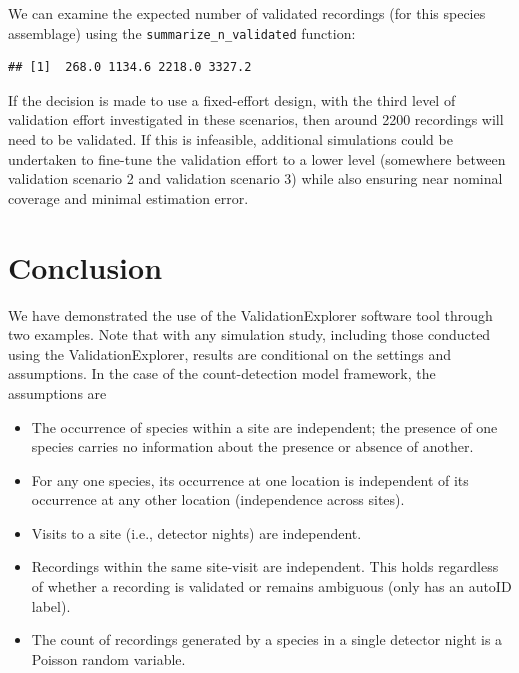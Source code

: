 \documentclass[
]{article}
\newenvironment{Shaded}{\begin{snugshade}}{\end{snugshade}}
\newcommand{\FunctionTok}[1]{\textcolor[rgb]{0.13,0.29,0.53}{\textbf{#1}}}
\newcommand{\NormalTok}[1]{#1}
\newcommand{\SpecialCharTok}[1]{\textcolor[rgb]{0.81,0.36,0.00}{\textbf{#1}}}
\providecommand{\tightlist}{%
  \setlength{\itemsep}{0pt}\setlength{\parskip}{0pt}}
\begin{document}
We can examine the expected number of validated recordings (for this species assemblage) using the \texttt{summarize\_n\_validated} function:

\linespread{1}

\begin{Shaded}
\end{Shaded}

\begin{verbatim}
## [1]  268.0 1134.6 2218.0 3327.2
\end{verbatim}

\linespread{1}

If the decision is made to use a fixed-effort design, with the third level of validation effort investigated in these scenarios, then around 2200 recordings will need to be validated. If this is infeasible, additional simulations could be undertaken to fine-tune the validation effort to a lower level (somewhere between validation scenario 2 and validation scenario 3) while also ensuring near nominal coverage and minimal estimation error.

\hypertarget{conclusion}{%
\section{Conclusion}\label{conclusion}}

We have demonstrated the use of the ValidationExplorer software tool through two examples. Note that with any simulation study, including those conducted using the ValidationExplorer, results are conditional on the settings and assumptions. In the case of the count-detection model framework, the assumptions are

\begin{itemize}
\tightlist
\item
  The occurrence of species within a site are independent; the presence of one species carries no information about the presence or absence of another.
\item
  For any one species, its occurrence at one location is independent of its occurrence at any other location (independence across sites).
\item
  Visits to a site (i.e., detector nights) are independent.
\item
  Recordings within the same site-visit are independent. This holds regardless of whether a recording is validated or remains ambiguous (only has an autoID label).
\item
  The count of recordings generated by a species in a single detector night is a Poisson random variable.
\end{itemize}
\end{document}
